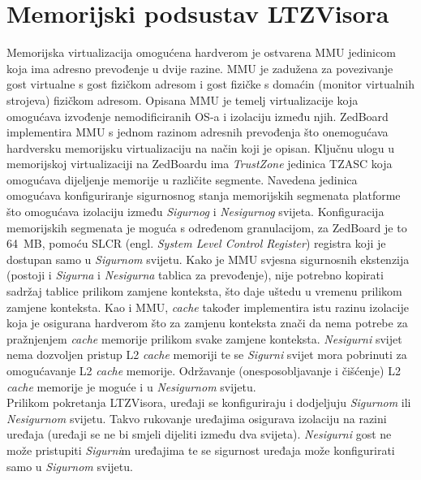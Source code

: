 \documentclass[times, utf8, diplomski, numeric]{fer}
\begin{document}
\section{Memorijski podsustav LTZVisora}
Memorijska virtualizacija omogućena hardverom je ostvarena MMU jedinicom koja ima adresno prevođenje u dvije razine. MMU je
zadužena za povezivanje gost virtualne s gost fizičkom adresom i gost fizičke s domaćin (monitor virtualnih strojeva) fizičkom
adresom. Opisana MMU je temelj virtualizacije koja omogućava izvođenje nemodificiranih OS-a i izolaciju između njih. ZedBoard
implementira MMU s jednom razinom adresnih prevođenja što onemogućava hardversku memorijsku virtualizaciju na način koji je
opisan. Ključnu ulogu u memorijskoj virtualizaciji na ZedBoardu ima \textit{TrustZone} jedinica TZASC koja omogućava dijeljenje
memorije u različite segmente. Navedena jedinica omogućava konfiguriranje sigurnosnog stanja memorijskih segmenata platforme
što omogućava izolaciju između \textit{Sigurnog} i \textit{Nesigurnog} svijeta. Konfiguracija memorijskih segmenata je moguća s određenom
granulacijom, za ZedBoard je to 64~MB, pomoću SLCR (engl. \textit{System Level Control Register}) registra koji je dostupan
samo u \textit{Sigurnom} svijetu. Kako je MMU svjesna sigurnosnih ekstenzija (postoji i \textit{Sigurna} i \textit{Nesigurna} tablica za prevođenje),
nije potrebno kopirati sadržaj tablice prilikom zamjene konteksta, što daje uštedu u vremenu prilikom zamjene konteksta.
Kao i MMU, \textit{cache} također implementira istu razinu izolacije koja je osigurana hardverom što za zamjenu konteksta
znači da nema potrebe za pražnjenjem \textit{cache} memorije prilikom svake zamjene konteksta. \textit{Nesigurni} svijet nema dozvoljen
pristup L2 \textit{cache} memoriji te se \textit{Sigurni} svijet mora pobrinuti za omogućavanje L2 \textit{cache} memorije. Održavanje
(onesposobljavanje i čišćenje) L2 \textit{cache} memorije je moguće i u \textit{Nesigurnom} svijetu. \\
Prilikom pokretanja LTZVisora, uređaji se konfiguriraju i dodjeljuju \textit{Sigurnom} ili \textit{Nesigurnom} svijetu. Takvo rukovanje uređajima
osigurava izolaciju na razini uređaja (uređaji se ne bi smjeli dijeliti između dva svijeta). \textit{Nesigurni} gost ne može pristupiti
\textit{Sigurni}m uređajima te se sigurnost uređaja može konfigurirati samo u \textit{Sigurnom} svijetu.
\end{document}
